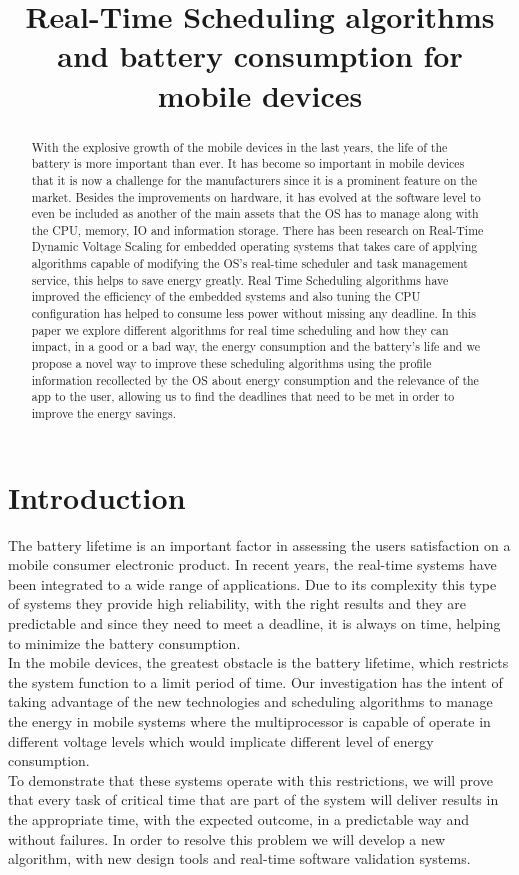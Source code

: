 \documentclass[conference]{IEEEtran}
\title{Real-Time Scheduling algorithms and battery consumption for mobile devices}
\author{\IEEEauthorblockN{David S\'anchez Alb\'an,   Natalia Mar\'in P\'erez,   Luis Diego Chavarr\'ia Ledezma,   Bryant \'Alvarez Canales}
\IEEEauthorblockA{Ingenier\'ia en Computaci\'on\\
Instituto Tecnol\'ogico de Costa Rica\\
San Jos\'e, Costa Rica}
}
\begin{document}
 
\maketitle


\begin{abstract}
With the explosive growth of the mobile devices in the last years, the life of the battery is more important than ever. It has become so important in mobile devices that it is now a challenge for the manufacturers since it is a prominent feature on the market. Besides the improvements on hardware, it has evolved at the software level to even be included as another of the main assets that the OS has to manage along with the CPU, memory, IO and information storage. There has been research on Real-Time Dynamic Voltage Scaling for embedded operating systems that takes care of applying algorithms capable of modifying the OS's real-time scheduler and task management service, this helps to save energy greatly. Real Time Scheduling algorithms have improved the efficiency of the embedded systems and also tuning the CPU configuration has helped to consume less power without missing any deadline. In this paper we explore different algorithms for real time scheduling and how they can impact, in a good or a bad way, the energy consumption and the battery’s life and we  propose a novel way to improve these scheduling algorithms using the profile information recollected by the OS about energy consumption and the relevance of the app to the user, allowing us to find the deadlines that need to be met in order to improve the energy savings.
\end{abstract}

\section{Introduction}

The battery lifetime is an important factor in assessing the users satisfaction on a mobile consumer electronic product. In recent years, the real-time systems have been integrated to a wide range of applications. Due to its complexity this type of systems they provide high reliability, with the right results and they are predictable and since they need to meet a deadline, it is always on time, helping to minimize the battery consumption.\cite{MANISH} \\
In the mobile devices, the greatest obstacle is the battery lifetime, which restricts the system function to a limit period of time. 
Our investigation has the intent of taking advantage of the new technologies and scheduling algorithms to manage the energy in mobile systems where the multiprocessor is capable of operate in different voltage levels which would implicate different level of energy consumption.\cite{PADM01}\\
To demonstrate that these systems operate with this restrictions, we will prove that every task of critical time that are part of the system will deliver results in the appropriate time, with the expected outcome, in a predictable way and without failures. 
In order to resolve this problem we will develop a new algorithm, with new design tools and real-time software validation systems.
\end{document}

